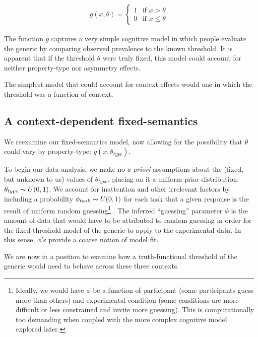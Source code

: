 \documentclass[10pt,letterpaper]{article}
\begin{document}
\begin{align}
 g(x, \theta) = \begin{cases}
   1 & \text{if } x > \theta \\
   0       & \text{if } x \leq \theta
  \end{cases}
   \label{eq:ftsem}
\end{align}

The function $g$ captures a very simple cognitive model in which people evaluate the generic by comparing observed prevalence to the known threshold.
It is apparent that if the threshold $\theta$ were truly fixed, this model could account for neither property-type nor asymmetry effects.

The simplest model that could account for context effects would one in which the threshold was a function of context. 


\subsection{A context-dependent fixed-semantics}

We reexamine our fixed-semantics model, now allowing for the possibility that $\theta$ could vary by property-type: $g(x,\theta_{type})$.

To begin our data analysis, we make no \emph{a priori} assumptions about the (fixed, but unknown to us) values of $\theta_{type}$, placing on it a uniform prior distribution: $\theta_{type} \thicksim U(0,1)$. 
We account for inattention and other irrelevant factors by including a probability $\phi_{task}\thicksim U(0,1)$ for each task that a given response is the result of uniform random guessing\footnote{Ideally, we would have $\phi$ be a function of participant (some participants guess more than others) and experimental condition (some conditions are more difficult or less constrained and invite more guessing). This is computationally too demanding when coupled with the more complex cognitive model explored later.}  \cite{LW2014}.
The inferred ``guessing'' parameter $\phi$ is the amount of data that would have to be attributed to random guessing in order for the fixed-threshold model of the generic to apply to the experimental data. In this sense, $\phi$'s provide a coarse notion of model fit. 


We are now in a position to examine how a truth-functional threshold of the generic would need to behave across these three contexts. 
\end{document}
